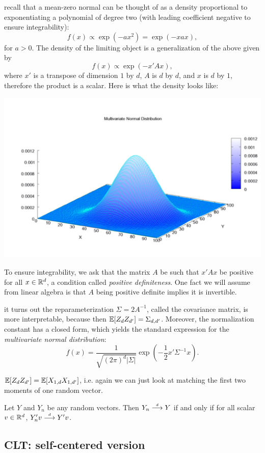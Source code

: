 \documentclass{article}
\begin{document}
 recall that a mean-zero normal can be thought of as a density proportional to exponentiating a polynomial of degree two (with leading coefficient negative to ensure integrability):
\[ f(x) \propto \exp(-a x^2) = \exp(- x a x), \]
for $a > 0$. The density of the limiting object is a generalization of the above given by
\[ f(x) \propto \exp(- x' A x), \]
where $x'$ is a transpose of dimension $1$ by $d$, $A$ is $d$ by $d$, and $x$ is $d$ by $1$, therefore the product is a scalar. Here is what the density looks like:
\begin{center}
	\includegraphics[width=0.5\linewidth]{figures/mvn} 
\end{center}
To ensure integrability, we ask that the matrix $A$ be such that $x' A x$ be positive  for all $x \in {\mathbb R}^d$, a condition called \emph{positive definiteness}. One fact we will assume from linear algebra is that $A$ being positive definite implies it is invertible. 

 it turns out the reparameterization $\Sigma = 2A^{-1}$, called the covariance matrix, is more interpretable, because then ${\mathbb E}[Z_{d} Z_{d'}] = \Sigma_{d,d'}$. Moreover, the normalization constant has a closed form, which yields the standard expression for the \emph{multivariate normal distribution}:
\[ f(x) = \frac{1}{\sqrt{(2\pi)^d |\Sigma|}} \exp\left(-\frac{1}{2} x' \Sigma^{-1} x\right). \]

 ${\mathbb E}[Z_{d} Z_{d'}] = {\mathbb E}[X_{1,d} X_{1,d'}]$, i.e. again we can just look at matching the first two moments of one random vector.  

 Let $Y$ and $Y_n$ be any random vectors. Then $Y_n \stackrel{\scriptscriptstyle d}{\longrightarrow} Y$ if and only if for all scalar $v \in {\mathbb R}^d$, $Y_n' v \stackrel{\scriptscriptstyle d}{\longrightarrow} Y' v$.


\subsection{CLT: self-centered version}\label{sec:clt-non-centered}
\end{document}
